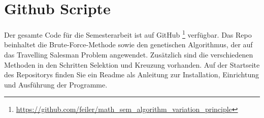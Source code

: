%
%
%
%
\section{Github Scripte
\label{buch:paper:varalg:section:github_scripte}}

Der gesamte Code für die Semesterarbeit ist auf GitHub 
\footnote{\url{https://github.com/feiler/math_sem_algorithm_variation_principle}}
\cite{algorythm:repo} verfügbar. Das Repo beinhaltet die Brute-Force-Methode sowie
den genetischen Algorithmus, der auf das Travelling Salesman Problem angewendet. Zusätzlich
sind die verschiedenen Methoden in den Schritten Selektion und Kreuzung vorhanden.
Auf der Startseite des Repositorys finden Sie ein Readme als Anleitung zur 
Installation, Einrichtung und Ausführung der Programme.